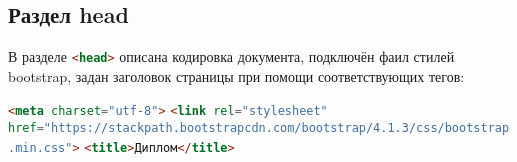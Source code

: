 \subsection{Раздел head}
В разделе \lstinline[language=HTML]{<head>} описана кодировка документа, подключён фаил стилей bootstrap, задан заголовок страницы при помощи соответствующих тегов:
\begin{itemize}
	\lstinline[language=HTML]{<meta charset="utf-8">}
	\lstinline[language=HTML]{<link rel="stylesheet" href="https://stackpath.bootstrapcdn.com/bootstrap/4.1.3/css/bootstrap.min.css">}
	\lstinline[language=HTML]{<title>Диплом</title>}
\end{itemize}